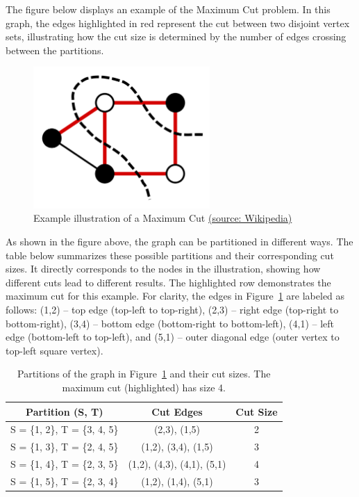 \documentclass[12pt]{article}
\begin{document}
The figure below displays an example of the Maximum Cut problem. 
In this graph, the edges highlighted in red represent the cut between two disjoint vertex sets, 
illustrating how the cut size is determined by the number of edges crossing between the partitions.

\begin{figure}[h!]
    \centering
    \includegraphics[width=0.6\textwidth]{images/maximum_cut_example.png}
    \caption{Example illustration of a Maximum Cut \protect\href{https://en.wikipedia.org/wiki/Maximum_cut}{(source: Wikipedia)}}
    \label{fig:maxcut-example}
\end{figure}
As shown in the figure above, the graph can be partitioned in different ways. 
The table below summarizes these possible partitions and their corresponding cut sizes. 
It directly corresponds to the nodes in the illustration, showing how different cuts 
lead to different results. The highlighted row demonstrates the maximum cut for this example. 
\singlespacing
\noindent
For clarity, the edges in Figure~\ref{fig:maxcut-example} are labeled as follows: 
(1,2) – top edge (top-left to top-right), 
(2,3) – right edge (top-right to bottom-right), 
(3,4) – bottom edge (bottom-right to bottom-left), 
(4,1) – left edge (bottom-left to top-left), 
and (5,1) – outer diagonal edge (outer vertex to top-left square vertex).


\begin{table}[h!]
\centering
\begin{tabular}{|c|c|c|}
\hline
\textbf{Partition (S, T)} & \textbf{Cut Edges} & \textbf{Cut Size} \\
\hline
\hline
S = \{1, 2\}, T = \{3, 4, 5\} & (2,3), (1,5) & 2 \\
S = \{1, 3\}, T = \{2, 4, 5\} & (1,2), (3,4), (1,5) & 3 \\
\rowcolor{yellow!20} S = \{1, 4\}, T = \{2, 3, 5\} & (1,2), (4,3), (4,1), (5,1) & 4 \\
S = \{1, 5\}, T = \{2, 3, 4\} & (1,2), (1,4), (5,1) & 3 \\
\hline
\end{tabular}
\caption{Partitions of the graph in Figure~\ref{fig:maxcut-example} and their cut sizes. The maximum cut (highlighted) has size 4.}
\end{table}
\end{document}
